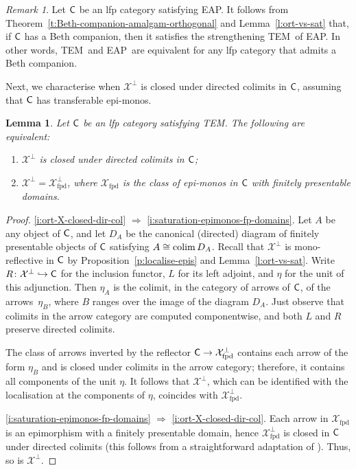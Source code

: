 \documentclass[a4paper,10pt,reqno]{amsart}
\newtheorem{lemma}[theorem]{Lemma}
\theoremstyle{definition}
\theoremstyle{remark}
\newtheorem{remark}[theorem]{Remark}
\newcommand{\cat}{{\sf C}}								%
\newcommand{\ar}[1]{\mathcal{#1}}							%
\newcommand{\X}{\ar{X}}									%
\newcommand{\into}{\hookrightarrow}						%
\newcommand{\ort}[1]{{#1}^{\perp}}						%
\newcommand{\colim}{\operatornamewithlimits{colim}}		%
\newcommand{\IMP}{\Rightarrow}						%
\newcommand{\EAP}{\textnormal{EAP}}
\newcommand{\TEM}{\textnormal{TEM}}
\begin{document}
\begin{remark}\label{rmk:EAP-vs-TEM}
Let $\cat$ be an lfp category satisfying \EAP. It follows from Theorem~\ref{t:Beth-companion-amalgam-orthogonal} and Lemma~\ref{l:ort-vs-sat} that, if $\cat$ has a Beth companion, then it satisfies the strengthening \TEM~of \EAP. In other words, \TEM~and \EAP~are equivalent for any lfp category that admits a Beth companion.
\end{remark}

Next, we characterise when $\ort{\X}$ is closed under directed colimits in $\cat$, assuming that $\cat$ has transferable epi-monos.

\begin{lemma}\label{l:X-ort-dir-colim-fp-domains}
Let $\cat$ be an lfp category satisfying \TEM. The following are equivalent:
\begin{enumerate}[label=(\arabic*)]
\item\label{i:ort-X-closed-dir-col} $\ort{\X}$ is closed under directed colimits in $\cat$;
\item\label{i:saturation-epimonos-fp-domains} $\ort{\X}=\X^{\perp}_{\mathrm{fpd}}$, where $\X_{\mathrm{fpd}}$ is the class of epi-monos in $\cat$ with finitely presentable domains.
\end{enumerate}
\end{lemma}

\begin{proof}
\ref{i:ort-X-closed-dir-col} $\IMP$ \ref{i:saturation-epimonos-fp-domains}. Let $A$ be any object of $\cat$, and let $D_{A}$ be the canonical (directed) diagram of finitely presentable objects of $\cat$ satisfying $A\cong \colim{D_{A}}$. Recall that $\ort{\X}$ is mono-reflective in $\cat$ by Proposition~\ref{p:localise-epis} and Lemma~\ref{l:ort-vs-sat}. Write $R\colon \ort{\X}\into \cat$ for the inclusion functor, $L$ for its left adjoint, and $\eta$ for the unit of this adjunction. Then $\eta_{A}$ is the colimit, in the category of arrows of $\cat$, of the arrows~$\eta_{B}$, where $B$ ranges over the image of the diagram $D_{A}$. Just observe that colimits in the arrow category are computed componentwise, and both $L$ and $R$ preserve directed colimits. 

The class of arrows inverted by the reflector $\cat \to \X^{\perp}_{\mathrm{fpd}}$ contains each arrow of the form $\eta_{B}$ and is closed under colimits in the arrow category; therefore, it contains all components of the unit $\eta$. It follows that $\ort{\X}$, which can be identified with the localisation at the components of $\eta$, coincides with $\X^{\perp}_{\mathrm{fpd}}$.

\ref{i:saturation-epimonos-fp-domains} $\IMP$ \ref{i:ort-X-closed-dir-col}. Each arrow in $\X_{\mathrm{fpd}}$ is an epimorphism with a finitely presentable domain, hence $\X^{\perp}_{\mathrm{fpd}}$ is closed in $\cat$ under directed colimits (this follows from a straightforward adaptation of \cite[Proposition~1.35]{ar94book}). Thus, so is $\ort{\X}$.
\end{proof}
\end{document}
